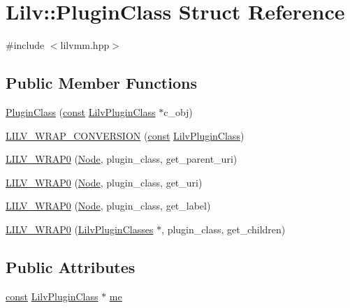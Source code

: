 \hypertarget{struct_lilv_1_1_plugin_class}{}\section{Lilv\+:\+:Plugin\+Class Struct Reference}
\label{struct_lilv_1_1_plugin_class}


{\ttfamily \#include $<$lilvmm.\+hpp$>$}

\subsection*{Public Member Functions}
\begin{DoxyCompactItemize}
\item 
\hyperlink{struct_lilv_1_1_plugin_class_a15a63a887b785a2fb3534bbc548ee055}{Plugin\+Class} (\hyperlink{getopt1_8c_a2c212835823e3c54a8ab6d95c652660e}{const} \hyperlink{lilv_8h_a94da06d43a4f980af280b9d8bf4ae1f0}{Lilv\+Plugin\+Class} $\ast$c\+\_\+obj)
\item 
\hyperlink{struct_lilv_1_1_plugin_class_aa1761458ff5dd133674cca5b5ce704a8}{L\+I\+L\+V\+\_\+\+W\+R\+A\+P\+\_\+\+C\+O\+N\+V\+E\+R\+S\+I\+ON} (\hyperlink{getopt1_8c_a2c212835823e3c54a8ab6d95c652660e}{const} \hyperlink{lilv_8h_a94da06d43a4f980af280b9d8bf4ae1f0}{Lilv\+Plugin\+Class})
\item 
\hyperlink{struct_lilv_1_1_plugin_class_a4cf0f8c1d8dec75c27a32e6215e5f551}{L\+I\+L\+V\+\_\+\+W\+R\+A\+P0} (\hyperlink{struct_lilv_1_1_node}{Node}, plugin\+\_\+class, get\+\_\+parent\+\_\+uri)
\item 
\hyperlink{struct_lilv_1_1_plugin_class_a6fa18e13b4e6a0dc652ddf42124ca289}{L\+I\+L\+V\+\_\+\+W\+R\+A\+P0} (\hyperlink{struct_lilv_1_1_node}{Node}, plugin\+\_\+class, get\+\_\+uri)
\item 
\hyperlink{struct_lilv_1_1_plugin_class_a43366f0f7bb163b565c745499a644c8d}{L\+I\+L\+V\+\_\+\+W\+R\+A\+P0} (\hyperlink{struct_lilv_1_1_node}{Node}, plugin\+\_\+class, get\+\_\+label)
\item 
\hyperlink{struct_lilv_1_1_plugin_class_aa45f4513dcc3ac4ff46984bf1fd53717}{L\+I\+L\+V\+\_\+\+W\+R\+A\+P0} (\hyperlink{lilv_8h_a1ef5389c0a24cb8e0adcf971d2d12f0e}{Lilv\+Plugin\+Classes} $\ast$, plugin\+\_\+class, get\+\_\+children)
\end{DoxyCompactItemize}
\subsection*{Public Attributes}
\begin{DoxyCompactItemize}
\item 
\hyperlink{getopt1_8c_a2c212835823e3c54a8ab6d95c652660e}{const} \hyperlink{lilv_8h_a94da06d43a4f980af280b9d8bf4ae1f0}{Lilv\+Plugin\+Class} $\ast$ \hyperlink{struct_lilv_1_1_plugin_class_adcf421b6de7fdbfa7e21b4003b23ca54}{me}
\end{DoxyCompactItemize}


